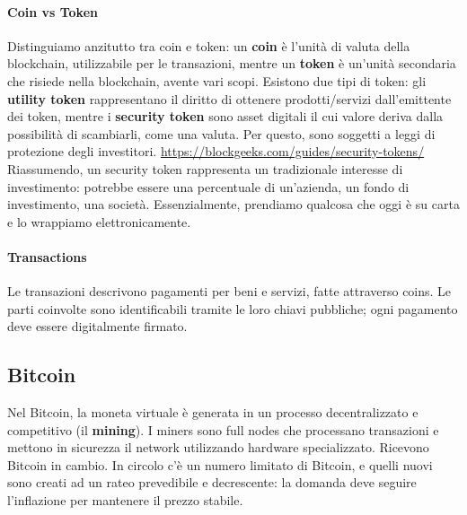 \documentclass[11pt]{article}
\begin{document}
\paragraph{Coin vs Token} Distinguiamo anzitutto tra coin e token: un \textbf{coin} è l'unità di valuta della blockchain, utilizzabile per le transazioni, mentre un \textbf{token} è un'unità secondaria che risiede nella blockchain, avente vari scopi. Esistono due tipi di token: gli \textbf{utility token} rappresentano il diritto di ottenere prodotti/servizi dall'emittente dei token, mentre i \textbf{security token} sono asset digitali il cui valore deriva dalla possibilità di scambiarli, come una valuta. Per questo, sono soggetti a leggi di protezione degli investitori. \href{Lettura interessante al riguardo qui.}{https://blockgeeks.com/guides/security-tokens/} Riassumendo, un security token rappresenta un tradizionale interesse di investimento: potrebbe essere una percentuale di un'azienda, un fondo di investimento, una società. Essenzialmente, prendiamo qualcosa che oggi è su carta e lo wrappiamo elettronicamente. 
\paragraph{Transactions} Le transazioni descrivono pagamenti per beni e servizi, fatte attraverso coins. Le parti coinvolte sono identificabili tramite le loro chiavi pubbliche; ogni pagamento deve essere digitalmente firmato. 
\subsection{Bitcoin}
Nel Bitcoin, la moneta virtuale è generata in un processo decentralizzato e competitivo (il \textbf{mining}). I miners sono full nodes che processano transazioni e mettono in sicurezza il network utilizzando hardware specializzato. Ricevono Bitcoin in cambio. In circolo c'è un numero limitato di Bitcoin, e quelli nuovi sono creati ad un rateo prevedibile e decrescente: la domanda deve seguire l'inflazione per mantenere il prezzo stabile. 
\end{document}

